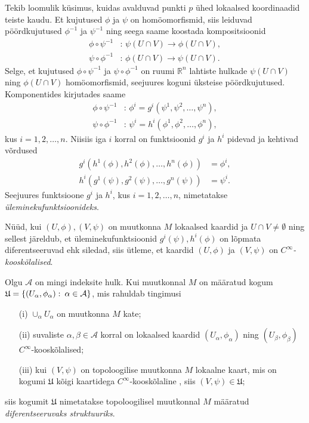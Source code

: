 \documentclass[12pt,a4paper,oneside]{article}
\theoremstyle{plain}
\theoremstyle{definition}
\numberwithin{equation}{section}
\def\R{{\mathbb R}}
\begin{document}
Tekib loomulik küsimus, kuidas avalduvad punkti $p$ ühed lokaalsed 
koordinaadid teiste kaudu. Et kujutused $\phi$ ja $\psi$ on 
homöomorfismid, siis leiduvad pöördkujutused $\phi^{-1}$ ja 
$\psi^{-1}$ ning seega saame koostada kompositsioonid
\begin{align*}
\phi \circ \psi^{-1} &\colon\, \psi\left(U \cap V\right) \rightarrow 
\phi\left(U \cap V\right), \\
\psi \circ \phi^{-1} &\colon\, \phi\left(U \cap V\right) \rightarrow 
\psi\left(U \cap V\right).
\end{align*}
Selge, et kujutused $\phi \circ \psi^{-1}$ ja $\psi \circ 
\phi^{-1}$ on ruumi $\R^n$ lahtiste hulkade 
$\psi\left(U \cap V\right)$ ning $\phi \left(U \cap V\right)$ 
homöomorfismid, seejuures koguni üksteise pöördkujutused. 
Komponentides kirjutades saame
\begin{align*}
\phi \circ \psi^{-1} &\colon\, \phi^i = g^i \left(\psi^1, \psi^2, 
\ldots, \psi^n\right), \\
\psi \circ \phi^{-1} &\colon\, \psi^i = h^i \left(\phi^1, \phi^2, 
\ldots, \phi^n\right),
\end{align*}
kus $i = 1, 2, \ldots, n$. Niisiis iga $i$ korral on funktsioonid 
$g^i$ ja $h^i$ pidevad ja kehtivad võrdused
\begin{align*}
g^i \left(h^1\left(\phi\right), h^2\left(\phi\right), \ldots, 
h^n\left(\phi\right)\right) &= \phi^i, \\
h^i \left(g^1\left(\psi\right), g^2\left(\psi\right), \ldots, 
g^n\left(\psi\right)\right) &= \psi^i.
\end{align*}
Seejuures funktsioone $g^i$ ja $h^i$, kus $i = 1, 2, \ldots, n$, 
nimetatakse \emph{üleminekufunktsioo\-nideks}. 

Nüüd, kui $\left(U, \phi\right), \left(V, \psi\right)$ on muutkonna 
$M$ lokaalsed kaardid ja $U \cap V \neq \emptyset$ ning sellest 
järeldub, et üleminekufunktsioonid 
$g^i\left(\psi\right), h^i\left(\phi\right)$ on lõpmata 
diferentseeruvad ehk siledad, siis ütleme, et kaardid 
$\left(U, \phi\right)$ ja $\left(V, \psi\right)$ on 
$C^{\infty}$\emph{-kooskõlalised}.

Olgu $\mathcal{A}$ on mingi indeksite hulk. Kui muutkonnal $M$ on 
määratud kogum $\mathfrak{U} =\nobreak \left\lbrace \left(U_\alpha, 
\phi_\alpha\right) \colon\, \alpha \in \mathcal{A} \right\rbrace$, 
mis rahuldab tingimusi
\begin{itemize}
\item [(i)] $\cup_\alpha U_\alpha$ on muutkonna $M$ kate;
\item [(ii)] suvaliste $\alpha, \beta \in \mathcal{A}$ 
korral on lokaalsed kaardid $\left(U_\alpha, \phi_\alpha\right)$ ning 
$\left(U_\beta, \phi_\beta\right)$ $C^\infty$-kooskõlalised;
\item [(iii)] kui $\left(V, \psi\right)$ on topoloogilise 
muutkonna $M$ lokaalne kaart, mis on kogumi $\mathfrak{U}$ kõigi 
kaartidega $C^\infty$-kooskõlaline , siis 
$\left(V, \psi\right) \in \mathfrak{U}$;
\end{itemize}
siis kogumit $\mathfrak{U}$ nimetatakse topoloogilisel muutkonnal 
$M$ määratud \emph{diferentseeruvaks struktuuriks}.
\end{document}
